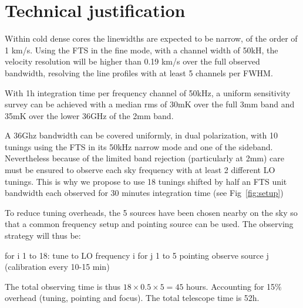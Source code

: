 \section{Technical justification}
 Within cold dense cores the linewidths are expected to be narrow, of the order of 1 km/s. Using the FTS in the fine mode, with a channel width of 50kH, the velocity resolution will be higher than 0.19 km/s over the full observed bandwidth, resolving the line profiles with at least 5 channels per FWHM.

With 1h integration time per frequency channel of 50kHz, a uniform sensitivity survey can be achieved with a median rms of 30mK over the full 3mm band and 35mK over the lower 36GHz of the 2mm band. 

A 36Ghz bandwidth can be covered uniformly, in dual polarization, with 10 tunings using the FTS in its 50kHz narrow mode and one of the sideband. Nevertheless because of the limited band rejection (particularly at 2mm) care must be ensured to observe each sky frequency with at least 2 different LO tunings. This is why we propose to use 18 tunings shifted by half an FTS unit bandwidth each observed for 30 minutes integration time (see Fig~\ref{fig:setup})

To reduce tuning overheads, the 5 sources have been chosen nearby on the sky so that a common frequency setup and pointing source can be used. The observing strategy will thus be: 

for i 1 to 18:
  tune to LO frequency i
  for j 1 to 5
    pointing
    observe source j (calibration every 10-15 min)

The total observing time is thus $18\times0.5\times5=45$ hours. Accounting for 15\% overhead (tuning, pointing and focus). The total telescope time is 52h.
   
  
  
  
  
  
  
  
  